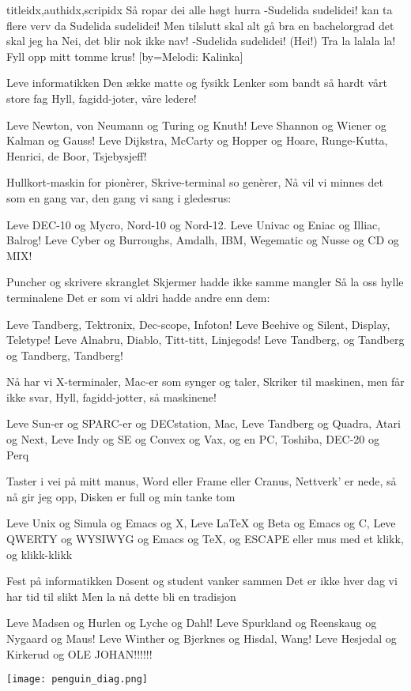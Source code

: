 \documentclass[14pt,letterpaper,norsk]{article}
\begin{document}
\begin{songs}{titleidx,authidx,scripidx}
\beginchorus
Så ropar dei alle høgt hurra
-Sudelida sudelidei!
kan ta flere verv da
Sudelida sudelidei!
Men tilslutt skal alt gå bra
en bachelorgrad det skal jeg ha
Nei, det blir nok ikke nav!
-Sudelida sudelidei! (Hei!)
Tra la lalala la!
Fyll opp mitt tomme krus!
\endchorus
\endsong
{}[by=Melodi: Kalinka]

\beginverse
Leve informatikken
Den ække matte og fysikk
Lenker som bandt så hardt vårt store fag
Hyll, fagidd-joter, våre ledere!
\endverse

\beginchorus
Leve Newton, von Neumann og Turing og Knuth!
Leve Shannon og Wiener og Kalman og Gauss!
Leve Dijkstra, McCarty og Hopper og Hoare,
Runge-Kutta, Henrici, de Boor, Tsjebysjeff!
\endchorus

\beginverse
Hullkort-maskin for pionèrer,
Skrive-terminal so genèrer,
Nå vil vi minnes det som en gang var,
den gang vi sang i gledesrus:
\endverse

\beginchorus
Leve DEC-10 og Mycro, Nord-10 og Nord-12.
Leve Univac og Eniac og Illiac, Balrog!
Leve Cyber og Burroughs, Amdalh, IBM,
Wegematic og Nusse og CD og MIX!
\endchorus

\beginverse
Puncher og skrivere skranglet
Skjermer hadde ikke samme mangler
Så la oss hylle terminalene
Det er som vi aldri hadde andre enn dem:
\endverse

\beginchorus
Leve Tandberg, Tektronix, Dec-scope, Infoton!
Leve Beehive og Silent, Display, Teletype!
Leve Alnabru, Diablo, Titt-titt, Linjegods!
Leve Tandberg, og Tandberg og Tandberg, Tandberg!
\endchorus

\beginverse
Nå har vi X-terminaler,
Mac-er som synger og taler,
Skriker til maskinen, men får ikke svar,
Hyll, fagidd-jotter, så maskinene!
\endverse

\beginchorus
Leve Sun-er og SPARC-er og DECstation, Mac,
Leve Tandberg og Quadra, Atari og Next,
Leve Indy og SE og Convex og Vax,
og en PC, Toshiba, DEC-20 og Perq
\endchorus

\beginverse
Taster i vei på mitt manus,
Word eller Frame eller Cranus,
Nettverk' er nede, så nå gir jeg opp,
Disken er full og min tanke tom
\endverse

\beginchorus
Leve Unix og Simula og Emacs og X,
Leve \LaTeX{} og Beta og Emacs og C,
Leve QWERTY og WYSIWYG og Emacs og \TeX{},
og ESCAPE eller mus med et klikk, og klikk-klikk
\endchorus

\beginverse
Fest på informatikken
Dosent og student vanker sammen
Det er ikke hver dag vi har tid til slikt
Men la nå dette bli en tradisjon
\endverse

\beginchorus
Leve Madsen og Hurlen og Lyche og Dahl!
Leve Spurkland og Reenskaug og Nygaard og Maus!
Leve Winther og Bjerknes og Hisdal, Wang!
Leve Hesjedal og Kirkerud og OLE JOHAN!!!!!!
\endchorus
\endsong

\end{songs}

\newpage

\texttt{[image: penguin\_diag.png]}
\end{document}
